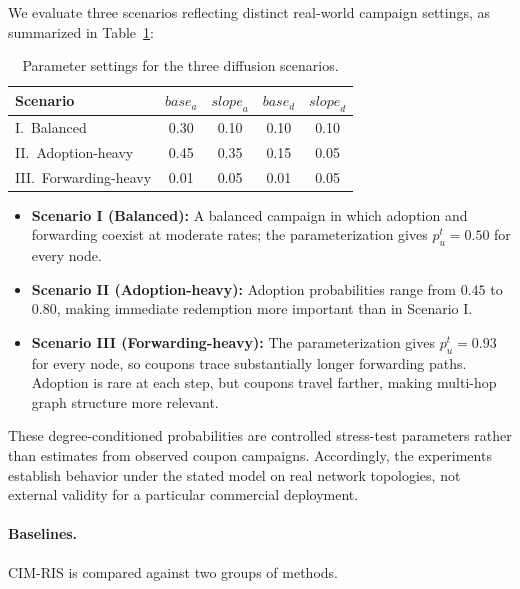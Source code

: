 \documentclass[sigconf,balance=false]{acmart}
\newcommand{\CIMRIS}{\textsc{CIM-RIS}}
\begin{document}
We evaluate three scenarios reflecting distinct real-world campaign
settings, as summarized in Table~\ref{tab:scenarios}:

\begin{table}[t]
  \caption{Parameter settings for the three diffusion scenarios.}
  \label{tab:scenarios}
  \centering
  \begin{tabular}{lcccc}
    \toprule
    Scenario & $\mathit{base}_a$ & $\mathit{slope}_a$ &
              $\mathit{base}_d$ & $\mathit{slope}_d$ \\
    \midrule
    I.\ Balanced       & 0.30 & 0.10 & 0.10 & 0.10 \\
    II.\ Adoption-heavy & 0.45 & 0.35 & 0.15 & 0.05 \\
    III.\ Forwarding-heavy & 0.01 & 0.05 & 0.01 & 0.05 \\
    \bottomrule
  \end{tabular}
\end{table}

\begin{itemize}[leftmargin=*]
  \item \textbf{Scenario I (Balanced):}
    A balanced campaign in which adoption and forwarding coexist at
    moderate rates; the parameterization gives $p_u^t=0.50$ for every
    node.
  \item \textbf{Scenario II (Adoption-heavy):}
    Adoption probabilities range from $0.45$ to $0.80$, making immediate
    redemption more important than in Scenario I.
  \item \textbf{Scenario III (Forwarding-heavy):}
    The parameterization gives $p_u^t=0.93$ for every node, so coupons
    trace substantially longer forwarding paths.
    Adoption is rare at each step, but coupons travel farther, making
    multi-hop graph structure more relevant.
\end{itemize}

These degree-conditioned probabilities are controlled stress-test
parameters rather than estimates from observed coupon campaigns.
Accordingly, the experiments establish behavior under the stated model
on real network topologies, not external validity for a particular
commercial deployment.

\paragraph{Baselines.}
\CIMRIS{} is compared against two groups of methods.
\end{document}
